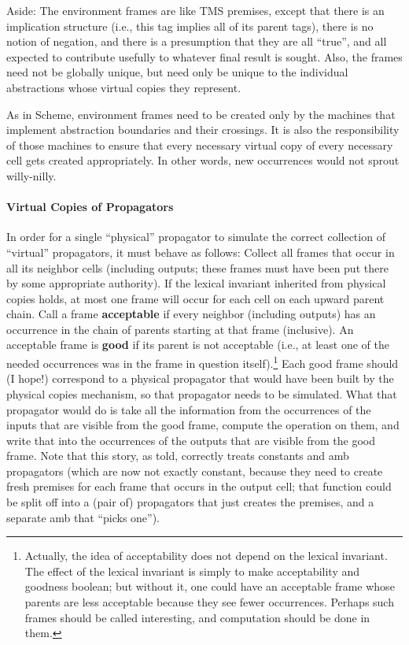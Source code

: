 \documentclass{article}
\newcommand{\defn}[1]{{\bfseries{#1}}}
\begin{document}
Aside: The environment frames are like TMS premises, except that
there is an implication structure (i.e., this tag implies all of
its parent tags), there is no notion of negation, and there is a
presumption that they are all ``true'', and all expected to
contribute usefully to whatever final result is sought.  Also,
the frames need not be globally unique, but need only be unique to
the individual abstractions whose virtual copies they represent.

As in Scheme, environment frames need to be created only by the
machines that implement abstraction boundaries and their crossings.
It is also the responsibility of those machines to ensure that every
necessary virtual copy of every necessary cell gets created
appropriately.  In other words, new occurrences would not sprout
willy-nilly.

\paragraph{Virtual Copies of Propagators}
In order for a single ``physical'' propagator to simulate the
correct collection of ``virtual'' propagators, it must behave as
follows: Collect all frames that occur in all its neighbor cells
(including outputs; these frames must have been put there by some
appropriate authority).  If the lexical invariant inherited from
physical copies holds, at most one frame will occur for each cell
on each upward parent chain.  Call a frame \defn{acceptable} if every
neighbor (including outputs) has an occurrence in the chain of
parents starting at that frame (inclusive).  An acceptable frame is \defn{good}
if its parent is not acceptable (i.e., at least one of the needed
occurrences was in the frame in question itself).\footnote{Actually,
the idea of acceptability does not depend on the lexical invariant.
The effect of the lexical invariant is simply to make acceptability
and goodness boolean; but without it, one could have an acceptable
frame whose parents are less acceptable because they see fewer
occurrences.  Perhaps such frames should be called interesting,
and computation should be done in them.}  Each 
good frame should (I hope!) correspond to a physical propagator
that would have been built by the physical copies mechanism, so
that propagator needs to be simulated.  What that propagator would
do is take all the information from the occurrences of the inputs
that are visible from the good frame, compute the operation on
them, and write that into the occurrences of the outputs that are
visible from the good frame.  Note that this story, as told,
correctly treats constants and amb propagators (which are now not exactly
constant, because they need to create fresh premises for each
frame that occurs in the output cell; that function could be split
off into a (pair of) propagators that just creates the premises,
and a separate amb that ``picks one'').
\end{document}
